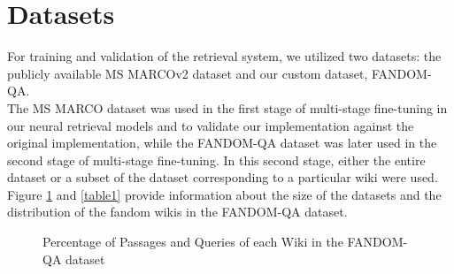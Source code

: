 \documentclass[11pt]{article}
\begin{document}
\section{Datasets}
\label{chap:datasets}
For training and validation of the retrieval system, we utilized two datasets: the publicly available MS MARCOv2 \cite{bajaj2018ms} dataset and our custom dataset, FANDOM-QA. \\
The MS MARCO dataset was used in the first stage of multi-stage fine-tuning in our neural retrieval models and to validate our implementation against the original implementation, while the FANDOM-QA dataset was later used in the second stage of multi-stage fine-tuning. In this second stage, either the entire dataset or a subset of the dataset corresponding to a particular wiki were used. \\
Figure \ref{qword-dist} and \ref{table1} provide information about the size of the datasets and the distribution of the fandom wikis in the FANDOM-QA dataset.

\begin{figure}
    \centering
    \caption{Percentage of Passages and Queries of each Wiki in the FANDOM-QA dataset}
    \label{qword-dist}
\end{figure}
\setlength{\textfloatsep}{8pt} 
\end{document}
